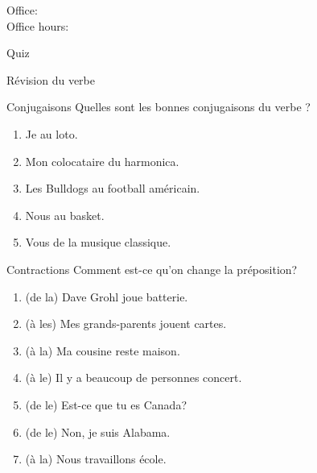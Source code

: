 \documentclass{beamer}
\subtitle[Loisirs (jouer) et prépositions]{Les loisirs que nous jouons et \lexi{à} et \lexi{de}}
\begin{document}
  \begin{frame}
    \titlepage
    \tiny{Office: \\
          Office hours: }
  \end{frame}

  \begin{frame}{}
    \begin{center}
      \Large Quiz
    \end{center}
  \end{frame}

  \begin{frame}{Révision du verbe}
    \begin{center}
      
    \end{center}
  \end{frame}
  
  \begin{frame}{Conjugaisons }
    Quelles sont les bonnes conjugaisons du verbe ? \\
    \begin{enumerate}
      \item Je \underline{} au loto.
      \item Mon colocataire \underline{} du harmonica.
      \item Les Bulldogs \underline{} au football américain.
      \item Nous \underline{} au basket.
      \item Vous \underline{} de la musique classique.
    \end{enumerate}
  \end{frame}

  \begin{frame}{Contractions }
    Comment est-ce qu'on change la préposition? \\
    \begin{enumerate}
      \item (de la) Dave Grohl joue \underline{} batterie.
      \item (à les) Mes grands-parents jouent \underline{} cartes.
      \item (à la) Ma cousine reste \underline{} maison.
      \item (à le) Il y a beaucoup de personnes \underline{} concert.
      \item (de le) Est-ce que tu es \underline{} Canada?
      \item (de le) Non, je suis \underline{} Alabama.
      \item (à la) Nous travaillons \underline{} école.
    \end{enumerate}
  \end{frame}
\end{document}
